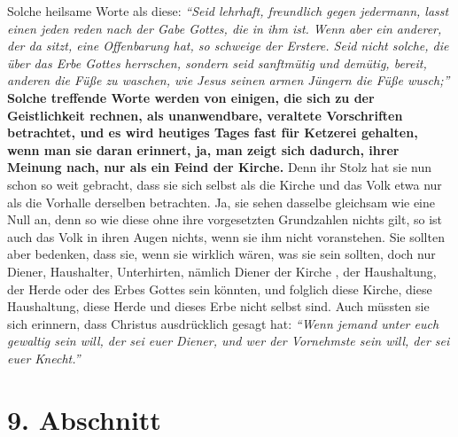 Solche heilsame Worte als diese:
\textit{"`Seid lehrhaft, freundlich gegen jedermann,
lasst einen jeden reden nach der Gabe Gottes, die in ihm ist. Wenn aber ein
anderer, der da sitzt, eine Offenbarung hat, so schweige der Erstere. Seid nicht
solche, die über das Erbe Gottes herrschen, sondern seid sanftmütig und
demütig, bereit, anderen die Füße zu waschen, wie Jesus seinen armen Jüngern die
Füße wusch;"'}
\textbf{Solche treffende Worte werden von
einigen, die sich zu der Geistlichkeit rechnen, als
unanwendbare, veraltete
Vorschriften betrachtet, und es wird heutiges Tages fast für
Ketzerei gehalten,
wenn man sie daran erinnert, ja, man zeigt sich dadurch, ihrer Meinung nach, nur
als ein Feind der Kirche.} Denn ihr Stolz hat sie nun
schon so weit gebracht,
dass sie sich selbst als die Kirche und das Volk etwa nur als die Vorhalle
derselben betrachten. Ja, sie sehen dasselbe gleichsam wie eine Null an, denn so
wie diese ohne ihre vorgesetzten Grundzahlen nichts gilt, so ist auch das Volk
in
ihren Augen nichts, wenn sie ihm nicht voranstehen. Sie sollten aber bedenken,
dass sie, wenn sie wirklich wären, was sie sein sollten, doch nur Diener,
Haushalter, Unterhirten, nämlich Diener der Kirche
, der
Haushaltung, der Herde
oder des Erbes Gottes sein könnten, und folglich diese Kirche, diese
Haushaltung, diese Herde und dieses Erbe nicht selbst sind. Auch müssten sie
sich erinnern, dass Christus ausdrücklich gesagt hat:
\textit{"`Wenn jemand unter euch
gewaltig sein will, der sei euer Diener, und wer der Vornehmste sein will, der
sei euer Knecht."'}

\section{9. Abschnitt} \label{kap12_ab9}

